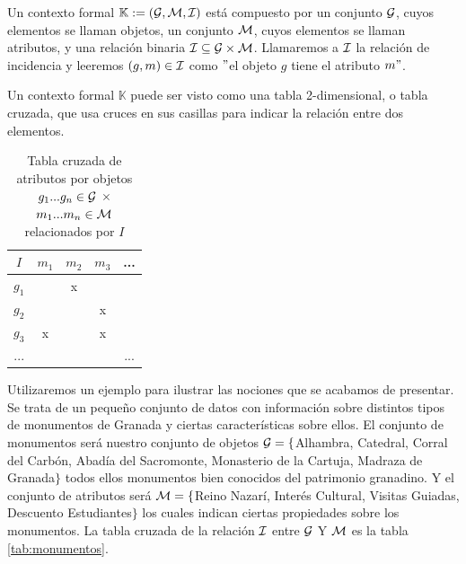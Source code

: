 \documentclass[oneside,openright,titlepage,numbers=noenddot,openany,headinclude,footinclude=true,
cleardoublepage=empty,abstractoff,BCOR=5mm,paper=a4,fontsize=12pt,main=spanish]{scrreprt}
\begin{document}
\begin{definition} Un contexto formal $\mathbb{K}:=(\mathcal{G},\mathcal{M},\mathcal{I})$ está compuesto por un conjunto $\mathcal{G}$, cuyos elementos se llaman objetos, un conjunto $\mathcal{M}$, cuyos elementos se llaman atributos, y una relación binaria $\mathcal{I} \subseteq \mathcal{G} \times \mathcal{M}$. Llamaremos a $\mathcal{I}$ la relación de incidencia y leeremos $(g,m) \in \mathcal{I}$ como $"$el objeto $g$ tiene el atributo $m"$. 
\end{definition}


Un contexto formal $\mathbb{K}$ puede ser visto como una tabla 2-dimensional, o tabla cruzada, que usa cruces en sus casillas para indicar la relación entre dos elementos.

\begin{table}[H]
    \centering
    \begin{tabular}{ |c|c|c|c|c| }
        \hline
         $I$ &  $m_{1}$ &  $m_{2}$ &  $m_{3}$ &  ... \\\hline
         $g_{1}$&  & x& &\\\hline
         $g_{2}$&  & &x&\\\hline
         $g_{3}$&x  & &x&\\\hline
         ...&  &  & &...\\\hline
    \end{tabular}
    \caption{Tabla cruzada de atributos por objetos $g_{1} ... g_{n} \in \mathcal{G}$ $\times$ $m_{1}... m_{n} \in \mathcal{M}$ relacionados por $I$}
    \label{tab:my_label}
\end{table}


Utilizaremos un ejemplo para ilustrar las nociones que se acabamos de presentar. Se trata de un pequeño conjunto de datos con información sobre distintos tipos de monumentos de Granada y ciertas características sobre ellos. El conjunto de monumentos será nuestro conjunto de objetos $\mathcal{G} = \{$Alhambra, Catedral, Corral del Carbón, Abadía del Sacromonte, Monasterio de la Cartuja, Madraza de Granada$\}$ todos ellos monumentos bien conocidos del patrimonio granadino. Y el conjunto de atributos será $\mathcal{M} = \{$Reino Nazarí,  Interés Cultural, Visitas Guiadas, Descuento Estudiantes$\}$ los cuales indican ciertas propiedades sobre los monumentos. La tabla cruzada de la relación $\mathcal{I}$ entre $\mathcal{G}$ Y $\mathcal{M}$ es la tabla \ref{tab:monumentos}.
\end{document}
